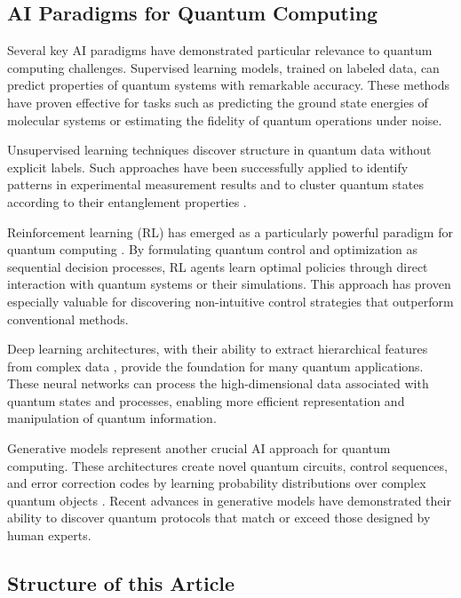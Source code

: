 \subsection{AI Paradigms for Quantum Computing}

Several key AI paradigms have demonstrated particular relevance to quantum computing challenges. Supervised learning models, trained on labeled data, can predict properties of quantum systems with remarkable accuracy. These methods have proven effective for tasks such as predicting the ground state energies of molecular systems or estimating the fidelity of quantum operations under noise.

Unsupervised learning techniques discover structure in quantum data without explicit labels. Such approaches have been successfully applied to identify patterns in experimental measurement results and to cluster quantum states according to their entanglement properties \cite{janiesch2021machine}.

Reinforcement learning (RL) has emerged as a particularly powerful paradigm for quantum computing \cite{arulkumaran2017deep, shakya2023reinforcement}. By formulating quantum control and optimization as sequential decision processes, RL agents learn optimal policies through direct interaction with quantum systems or their simulations. This approach has proven especially valuable for discovering non-intuitive control strategies that outperform conventional methods.

Deep learning architectures, with their ability to extract hierarchical features from complex data \cite{lecun2015deep}, provide the foundation for many quantum applications. These neural networks can process the high-dimensional data associated with quantum states and processes, enabling more efficient representation and manipulation of quantum information.

Generative models represent another crucial AI approach for quantum computing. These architectures create novel quantum circuits, control sequences, and error correction codes by learning probability distributions over complex quantum objects \cite{bernardo2007generative}. Recent advances in generative models have demonstrated their ability to discover quantum protocols that match or exceed those designed by human experts.

\subsection{Structure of this Article}

